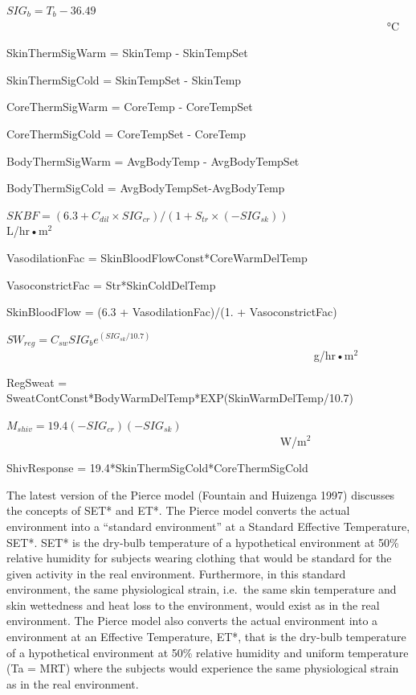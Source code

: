 \(SI{G_b} = {T_b} - 36.49\) ~~~~~~~~~~~~~~~~~~~~~~~~~~~~~~~~~~~~~~~~~~~~~~~~~~~~~~~~~~~~~~~~~~~ °C

SkinThermSigWarm = SkinTemp - SkinTempSet

SkinThermSigCold = SkinTempSet - SkinTemp

CoreThermSigWarm = CoreTemp - CoreTempSet

CoreThermSigCold = CoreTempSet - CoreTemp

BodyThermSigWarm = AvgBodyTemp - AvgBodyTempSet

BodyThermSigCold = AvgBodyTempSet-AvgBodyTemp

\(SKBF = (6.3 + C{}_{dil} \times SI{G_{cr}})/(1 + {S_{tr}} \times ( - SI{G_{sk}}))\) ~~~~~~~~~~~~~~~~~~~~~ L/hr•m\(^{2}\)

VasodilationFac = SkinBloodFlowConst*CoreWarmDelTemp

VasoconstrictFac = Str*SkinColdDelTemp

SkinBloodFlow = (6.3 + VasodilationFac)/(1. + VasoconstrictFac)

\(S{W_{reg}} = {C_{sw}}SI{G_b}{e^{(SI{G_{sk}}/10.7)}}\) ~~~~~~~~~~~~~~~~~~~~~~~~~~~~~~~~~~~~~~~~~~~~~~~~~~~~~~ g/hr•m\(^{2}\)

RegSweat = SweatContConst*BodyWarmDelTemp*EXP(SkinWarmDelTemp/10.7)

\({M_{shiv}} = 19.4( - SI{G_{cr}})( - SI{G_{sk}})\) ~~~~~~~~~~~~~~~~~~~~~~~~~~~~~~~~~~~~~~~~~~~~~~~~ W/m\(^{2}\)

ShivResponse = 19.4*SkinThermSigCold*CoreThermSigCold

The latest version of the Pierce model (Fountain and Huizenga 1997) discusses the concepts of SET* and ET*. The Pierce model converts the actual environment into a ``standard environment'' at a Standard Effective Temperature, SET*. SET* is the dry-bulb temperature of a hypothetical environment at 50\% relative humidity for subjects wearing clothing that would be standard for the given activity in the real environment. Furthermore, in this standard environment, the same physiological strain, i.e.~the same skin temperature and skin wettedness and heat loss to the environment, would exist as in the real environment. The Pierce model also converts the actual environment into a environment at an Effective Temperature, ET*, that is the dry-bulb temperature of a hypothetical environment at 50\% relative humidity and uniform temperature (Ta = MRT) where the subjects would experience the same physiological strain as in the real environment.

